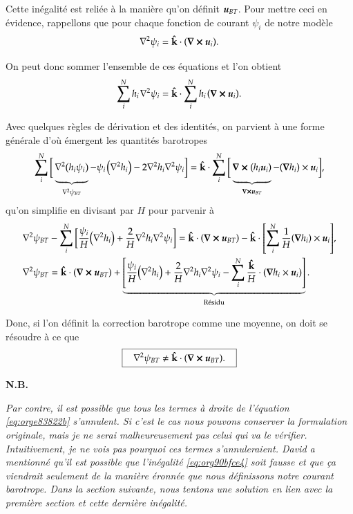 \documentclass[10pt]{article}
\numberwithin{equation}{section}
\newcommand{\kvf}{\vb{\hat{k}}}
\newcommand{\uu}{\vb*{u}}
\newcommand{\pt}{\hspace{1pt}}
\newcommand{\grande}{\vphantom{\frac{1}{xx}}}
\newcommand{\nb}{\textbf{N.B.}\hspace{4pt}}
\begin{document}
Cette inégalité est reliée à la manière qu'on définit \(\uu_{BT}\).
Pour mettre ceci en évidence, rappellons que pour chaque fonction de courant \(\psi_i\) de notre modèle
\begin{equation}
   \laplacian{\psi_i} = \kvf\cdot\qty(\curl{\uu_i}).
\end{equation}

On peut donc sommer l'ensemble de ces équations et l'on obtient
\begin{equation}
   \sum_i^Nh_i\pt\laplacian{\psi_i} = \kvf\cdot \sum_i^N h_i\pt \qty(\curl{\uu_i}).
\end{equation}

Avec quelques règles de dérivation et des identités, on parvient à une forme générale d'où émergent les quantités barotropes
\begin{align}
   \sum_i^N \bigg[ \underbrace{\grande\laplacian(h_i\psi_i)}_{\laplacian{\psi_{BT}}} - \psi_i\pt\qty(\laplacian{h_i}) - 2 \laplacian{h_i}\laplacian{\psi_i}\bigg]
    = \kvf\cdot \sum_i^N \bigg[ \underbrace{\grande\curl(h_i \uu_i)}_{\curl{\uu_{BT}}}  - \qty(\gradient{h_i})\times\uu_i\bigg],
\end{align}
qu'on simplifie en divisant par \(H\) pour parvenir à
\begin{align}
\label{eq:orge83822b}
   &\laplacian{\psi_{BT}} - \sum_i^N \bigg[ \frac{\psi_i}{H} \qty(\laplacian{h_i}) + \frac{2}{H} \laplacian{h_i}\laplacian{\psi_i}\bigg]
    = \kvf\cdot  \qty(\curl{ \uu_{BT}}) - \kvf\cdot \qty[\sum_i^N \frac{1}{H} \qty(\gradient{h_i})\times\uu_i],\nonumber\\
%
   &\laplacian{\psi_{BT}}
    = \kvf\cdot  \qty(\curl{ \uu_{BT}}) + \underbrace{\qty[ \frac{\psi_i}{H} \qty(\laplacian{h_i}) + \frac{2}{H} \laplacian{h_i}\laplacian{\psi_i}  -
\sum_i^N \frac{\kvf}{H}\cdot\qty(\gradient{h_i}\times\uu_i)]}_\text{Résidu}.
\end{align}

Donc, si l'on définit la correction barotrope comme une moyenne, on doit se résoudre à ce que
\begin{equation}
\label{eq:org90bfce4}
   \boxed{\hspace{0.3cm}\laplacian{\psi_{BT}} \not= \kvf\cdot  \qty(\curl{ \uu_{BT}}).\hspace{0.3cm}}
\end{equation}

\nb\begin{minipage}[t]{0.9\linewidth}
\itshape Par contre, il est possible que tous les termes à droite de l'équation \ref{eq:orge83822b} s'annulent.
Si c'est le cas nous pouvons conserver la formulation originale, mais je ne serai malheureusement pas celui qui va le vérifier.
Intuitivement, je ne vois pas pourquoi ces termes s'annuleraient.
David a mentionné qu'il est possible que l'inégalité \ref{eq:org90bfce4} soit fausse et que ça viendrait seulement de la manière éronnée que nous définissons notre courant barotrope.
Dans la section suivante, nous tentons une solution en lien avec la première section et cette dernière inégalité.
\end{minipage}
\end{document}
